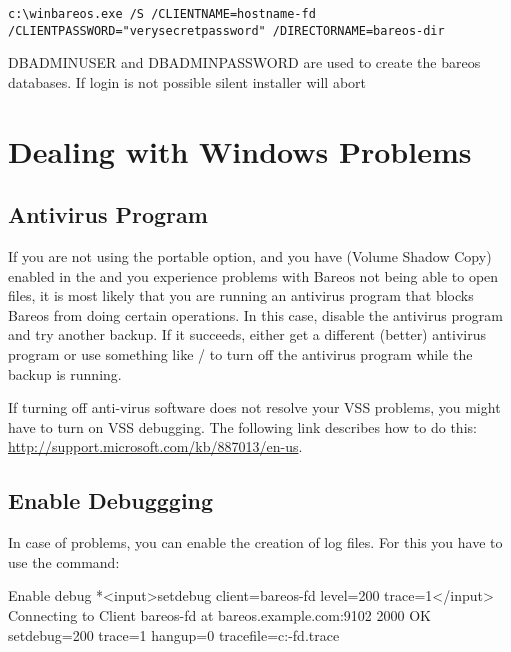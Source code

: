 \footnotesize
\begin{verbatim}
c:\winbareos.exe /S /CLIENTNAME=hostname-fd /CLIENTPASSWORD="verysecretpassword" /DIRECTORNAME=bareos-dir
\end{verbatim}
\normalsize

DBADMINUSER and DBADMINPASSWORD are used to create the bareos
databases. If login is not possible silent installer will abort


\section{Dealing with Windows Problems}

\subsection{Antivirus Program}

If you are not using the portable option, and you have
(Volume Shadow Copy) enabled in the \bareosDir and you experience
problems with Bareos not being able to open files, it is most
likely that you are running an antivirus program that blocks
Bareos from doing certain operations. In this case, disable the
antivirus program and try another backup.  If it succeeds, either
get a different (better) antivirus program or use something like
/
to turn off the antivirus program while
the backup is running.

If turning off anti-virus software does not resolve your VSS
problems, you might have to turn on VSS debugging.  The following
link describes how to do this:
\url{http://support.microsoft.com/kb/887013/en-us}.

\subsection{Enable Debuggging}

In case of problems, you can enable the creation of log files.
For this you have to use the   command:
\begin{bconsole}{Enable debug}
*<input>setdebug client=bareos-fd level=200 trace=1</input>
Connecting to Client bareos-fd at bareos.example.com:9102
2000 OK setdebug=200 trace=1 hangup=0 tracefile=c:\bareos-fd.trace
\end{bconsole}


